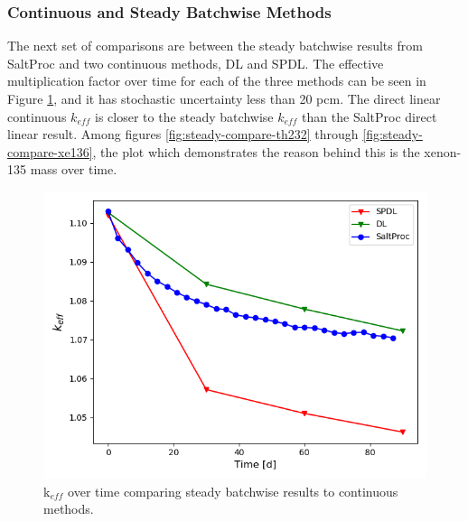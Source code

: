 \subsubsection{Continuous and Steady Batchwise Methods}

The next set of comparisons are between the steady batchwise results from SaltProc and two continuous methods, DL and SPDL. The effective multiplication factor over time for each of the three methods can be seen in Figure \ref{fig:steady-compare-keff}, and it has stochastic uncertainty less than 20 pcm.
The direct linear continuous $k_{eff}$ is closer to the steady batchwise $k_{eff}$ than the SaltProc direct linear result. Among figures \ref{fig:steady-compare-th232} through \ref{fig:steady-compare-xe136}, the plot which demonstrates the reason behind this is the xenon-135 mass over time.

\begin{figure}[H]
  \centering
  \includegraphics[scale=0.7]{images/soln-1-2-keff.png}
  \caption{k$_{eff}$ over time comparing steady batchwise results to continuous methods.}
   \label{fig:steady-compare-keff}
\end{figure}


